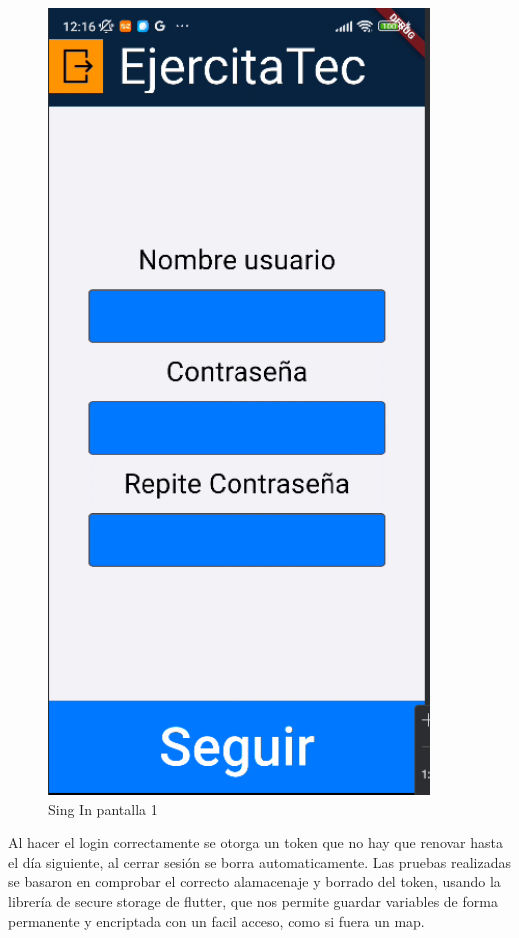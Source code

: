 \begin{figure}[H]
\begin{minipage}{0.45\textwidth}
      \centering
      \includegraphics[width=0.9\textwidth]{pantallas/SingIn1.png}
      \caption{Sing In pantalla 1}
      \label{fig:SingIn1}
   \end{minipage}
\end{figure}

\newpage

Al hacer el login correctamente se otorga un token que no hay que renovar hasta el día siguiente, al cerrar sesión se borra automaticamente. Las pruebas realizadas se basaron en comprobar el correcto alamacenaje y borrado del token, usando la librería de secure storage de flutter, que nos permite guardar variables de forma permanente y encriptada con un facil acceso, como si fuera un map.

